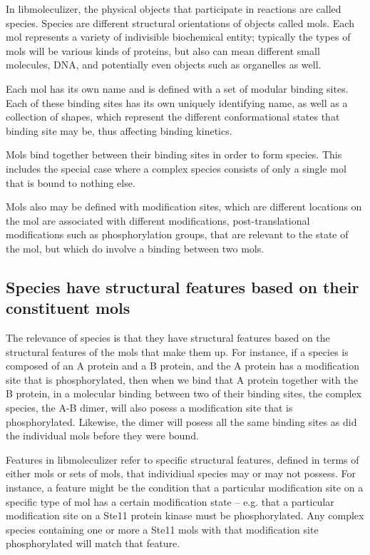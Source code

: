 In libmoleculizer, the physical objects that participate in reactions
are called species. Species are different structural orientations of
objects called mols. Each mol represents a variety of indivisible
biochemical entity; typically the types of mols will be various kinds
of proteins, but also can mean different small molecules, DNA, and
potentially even objects such as organelles as well.

Each mol has its own name and is defined with a set of modular binding
sites.  Each of these binding sites has its own uniquely identifying
name, as well as a collection of shapes, which represent the different
conformational states that binding site may be, thus affecting binding
kinetics.  

Mols bind together between their binding sites in order to form
species.  This includes the special case where a complex species
consists of only a single mol that is bound to nothing else.

Mols also may be defined with modification sites, which are different
locations on the mol are associated with different modifications,
post-translational modifications such as phosphorylation groups, that
are relevant to the state of the mol, but which do involve a binding
between two mols.  

\subsection{Species have structural features based on their
 constituent mols}

The relevance of species is that they have structural features based
on the structural features of the mols that make them up.  For
instance, if a species is composed of an A protein and a B protein,
and the A protein has a modification site that is phosphorylated, then
when we bind that A protein together with the B protein, in a
molecular binding between two of their binding sites, the complex
species, the A-B dimer, will also posess a modification site that is
phosphorylated. Likewise, the dimer will posess all the same binding
sites as did the individual mols before they were bound.

Features in libmoleculizer refer to specific structural features,
defined in terms of either mols or sets of mols, that individiual
species may or may not possess. For instance, a feature might be the
condition that a particular modification site on a specific type of
mol has a certain modification state -- e.g. that a particular
modification site on a Ste11 protein kinase must be
phosphorylated. Any complex species containing one or more a Ste11
mols with that modification site phosphorylated will match that
feature.

